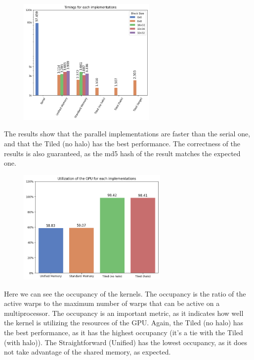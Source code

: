 \documentclass{article}
\begin{document}
\begin{figure}[H]
	\centering
	\includegraphics[width=0.6\textwidth]{./pics/timigs.png}
	\label{fig:timings}
\end{figure}

The results show that the parallel implementations are faster than the serial one, and that the Tiled (no halo) has the best performance. The correctness of the results is also guaranteed, as the md5 hash of the result matches the expected one.

\begin{figure}[H]
    \centering
    \includegraphics[width=0.65\textwidth]{./pics/occupancy.png}
    \label{fig:occupancy}
\end{figure}

Here we can see the occupancy of the kernels. The occupancy is the ratio of the active warps to the maximum number of warps that can be active on a multiprocessor. The occupancy is an important metric, as it indicates how well the kernel is utilizing the resources of the GPU. Again, the Tiled (no halo) has the best performance, as it has the highest occupancy (it's a tie with the Tiled (with halo)). The Straightforward (Unified) has the lowest occupancy, as it does not take advantage of the shared memory, as expected.
\end{document}
